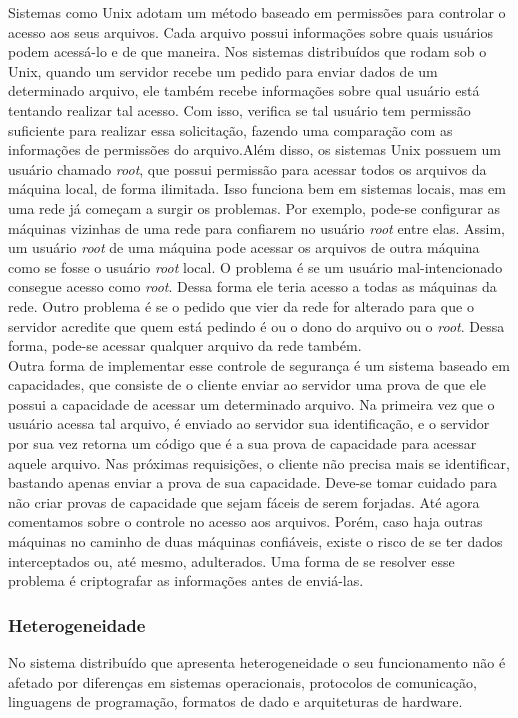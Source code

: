 	
	Sistemas como Unix adotam um método baseado em permissões para controlar o acesso aos seus arquivos. Cada arquivo possui informações sobre quais usuários podem acessá-lo e de que maneira.
	Nos sistemas distribuídos que rodam sob o Unix, quando um servidor recebe um pedido para enviar dados de um determinado arquivo, ele também recebe informações sobre qual usuário está tentando realizar tal acesso. Com isso, verifica se tal usuário tem permissão suficiente para realizar essa solicitação, fazendo uma comparação com as informações de permissões do arquivo.Além disso, os sistemas Unix possuem um usuário chamado \textit{root}, que possui permissão para acessar todos os arquivos da máquina local, de forma ilimitada. Isso funciona bem em sistemas locais, mas em uma rede já começam a surgir os problemas.
	Por exemplo, pode-se configurar as máquinas vizinhas de uma rede para confiarem no usuário \textit{root} entre elas. Assim, um usuário \textit{root} de uma máquina pode acessar os arquivos de outra máquina como se fosse o usuário \textit{root} local. O problema é se um usuário mal-intencionado consegue acesso como \textit{root}. Dessa forma ele teria acesso a todas as máquinas da rede. Outro problema é se o pedido que vier da rede for alterado para que o servidor acredite que quem está pedindo é ou o dono do arquivo ou o \textit{root}. Dessa forma, pode-se acessar qualquer arquivo da rede também. \\
	
	Outra forma de implementar esse controle de segurança é um sistema baseado em capacidades, que consiste de o cliente enviar ao servidor uma prova de que ele possui a capacidade de acessar um determinado arquivo. Na primeira vez que o usuário acessa tal arquivo, é enviado ao servidor sua identificação, e o servidor por sua vez retorna um código que é a sua prova de capacidade para acessar aquele arquivo. Nas próximas requisições, o cliente não precisa mais se identificar, bastando apenas enviar a prova de sua capacidade. Deve-se tomar cuidado para não criar provas de capacidade que sejam fáceis de serem forjadas. Até agora comentamos sobre o controle no acesso aos arquivos. Porém, caso haja outras máquinas no caminho de duas máquinas confiáveis, existe o risco de se ter dados interceptados ou, até mesmo, adulterados. Uma forma de se resolver esse problema é criptografar as informações antes de enviá-las.
	
	\subsubsection{Heterogeneidade}
	No sistema distribuído que apresenta heterogeneidade o seu funcionamento não é afetado por diferenças em sistemas operacionais, protocolos de comunicação, linguagens de programação, formatos de dado e arquiteturas de hardware. 
	
